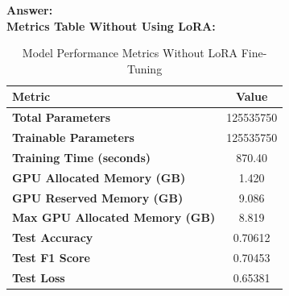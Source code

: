 \documentclass[11pt, oneside]{article}   	%
\begin{document}
\textbf{Answer:} \\
\textbf{Metrics Table Without Using LoRA: }
\\
\begin{table}[h!]
    \centering
    \begin{tabular}{|l|c|}
    \hline
    \textbf{Metric}                            & \textbf{Value}      \\ \hline
    \textbf{Total Parameters}                  & 125535750    \\ \hline
    \textbf{Trainable Parameters}              & 125535750    \\ \hline
    \textbf{Training Time (seconds)}           & 870.40             \\ \hline
    \textbf{GPU Allocated Memory (GB)}         & 1.420              \\ \hline
    \textbf{GPU Reserved Memory (GB)}          & 9.086              \\ \hline
    \textbf{Max GPU Allocated Memory (GB)}     & 8.819              \\ \hline
    \textbf{Test Accuracy}                     & 0.70612            \\ \hline
    \textbf{Test F1 Score}                     & 0.70453           \\ \hline
    \textbf{Test Loss}                         & 0.65381           \\ \hline
    \end{tabular}
    \caption{Model Performance Metrics Without LoRA Fine-Tuning}
    \end{table}
    
\end{document}

